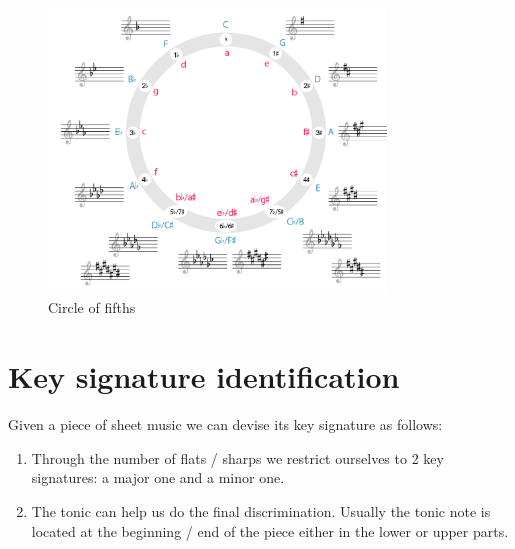 \begin{figure}
    \begin{center}
        \includegraphics[width=0.8\textwidth]{img/circle}
        \caption{Circle of fifths}
    \end{center}
\end{figure}

\section{Key signature identification}
Given a piece of sheet music we can devise its key signature as follows:
\begin{enumerate}
    \item Through the number of flats / sharps we restrict ourselves to 2 key signatures: a major one and a minor one.
    \item The tonic can help us do the final discrimination. Usually the tonic note is located at the beginning / end of the piece either in the lower or upper parts.
\end{enumerate}